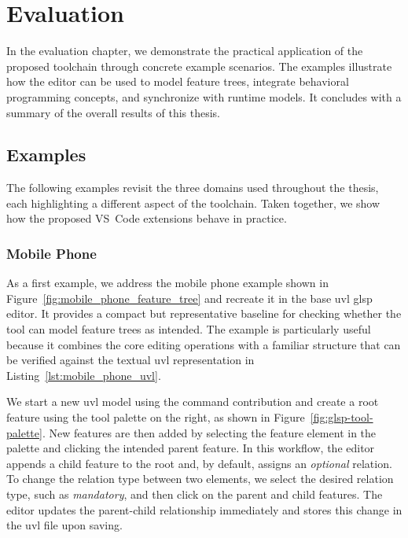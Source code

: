 \chapter{Evaluation}
\label{chapter:evaluation}

In the evaluation chapter, we demonstrate the practical application of the proposed toolchain through concrete example scenarios.
The examples illustrate how the editor can be used to model feature trees, integrate behavioral programming concepts, and synchronize with runtime models.
It concludes with a summary of the overall results of this thesis.

\section{Examples}
\label{sec:eval_examples}

The following examples revisit the three domains used throughout the thesis, each highlighting a different aspect of the toolchain.
Taken together, we show how the proposed VS~Code extensions behave in practice.

\subsection{Mobile Phone}
\label{subsec:eval_examples_mobile_phone}

As a first example, we address the mobile phone example shown in Figure~\ref{fig:mobile_phone_feature_tree} and recreate it in the base \gls{uvl} \gls{glsp} editor.
It provides a compact but representative baseline for checking whether the tool can model feature trees as intended.
The example is particularly useful because it combines the core editing operations with a familiar structure that can be verified against the textual \gls{uvl} representation in Listing~\ref{lst:mobile_phone_uvl}.

We start a new \gls{uvl} model using the command contribution and create a root feature using the tool palette on the right, as shown in Figure~\ref{fig:glsp-tool-palette}.
New features are then added by selecting the feature element in the palette and clicking the intended parent feature.
In this workflow, the editor appends a child feature to the root and, by default, assigns an \textit{optional} relation.
To change the relation type between two elements, we select the desired relation type, such as \textit{mandatory}, and then click on the parent and child features.
The editor updates the parent-child relationship immediately and stores this change in the \gls{uvl} file upon saving.


